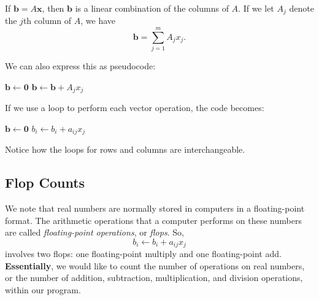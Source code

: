 \documentclass[letterpaper]{article}
\newcommand{\0}{\mathbf{0}}
\begin{document}
\begin{proposition}
    If $\mathbf{b} = A\mathbf{x}$, then $\mathbf{b}$ is a linear combination of the columns of $A$. If we let $A_j$ denote the $j$th column of $A$, we have 
    \[\mathbf{b} = \sum_{j = 1}^{m} A_j x_j.\]
\end{proposition}
We can also express this as pseudocode: 
\begin{algorithmic}
    \State $\mathbf{b} \gets \mathbf{0}$
        \State $\mathbf{b} \gets \mathbf{b} + A_j x_j$
    \EndFor
\end{algorithmic}
If we use a loop to perform each vector operation, the code becomes:
\begin{algorithmic}
    \State $\mathbf{b} \gets \mathbf{0}$
            \State $b_i \gets b_i + a_{ij} x_j$
        \EndFor 
    \EndFor
\end{algorithmic}
Notice how the loops for rows and columns are interchangeable.

\subsection{Flop Counts}
We note that real numbers are normally stored in computers in a floating-point format. The arithmetic operations that a computer performs on these numbers are called \emph{floating-point operations}, or \emph{flops}. So, 
\[b_i \gets b_i + a_{ij}x_j\]
involves two flops: one floating-point multiply and one floating-point add. \textbf{Essentially}, we would like to count the number of operations on real numbers, or the number of addition, subtraction, multiplication, and division operations, within our program.
\end{document}

